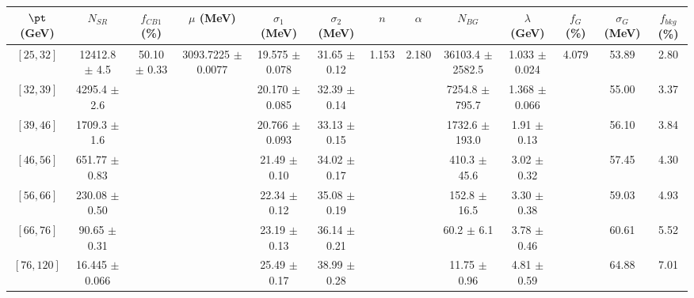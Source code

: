 \begin{tabular}{c||c|c|c|c|c|c|c|c|c|c|c||c}
$\pt$ (GeV) & $N_{SR}$ & $f_{CB1}$ (\%) & $\mu$ (MeV) & $\sigma_1$ (MeV) & $\sigma_2$ (MeV) & $n$ & $\alpha$ & $N_{BG}$ & $\lambda$ (GeV) & $f_G$ (\%) & $\sigma_G$ (MeV) & $f_{bkg}$ (\%) \\
\hline
$[25, 32]$ & 12412.8 $\pm$ 4.5 & \multirow{7}{*}{50.10 $\pm$ 0.33} & \multirow{7}{*}{3093.7225 $\pm$ 0.0077} & 19.575 $\pm$ 0.078 & 31.65 $\pm$ 0.12 & \multirow{7}{*}{1.153} & \multirow{7}{*}{2.180} & 36103.4 $\pm$ 2582.5 & 1.033 $\pm$ 0.024 & \multirow{7}{*}{4.079} & 53.89 & 2.80\\
$[32, 39]$ & 4295.4 $\pm$ 2.6 &  &  & 20.170 $\pm$ 0.085 & 32.39 $\pm$ 0.14 &  &  & 7254.8 $\pm$ 795.7 & 1.368 $\pm$ 0.066 &  & 55.00 & 3.37\\
$[39, 46]$ & 1709.3 $\pm$ 1.6 &  &  & 20.766 $\pm$ 0.093 & 33.13 $\pm$ 0.15 &  &  & 1732.6 $\pm$ 193.0 & 1.91 $\pm$ 0.13 &  & 56.10 & 3.84\\
$[46, 56]$ & 651.77 $\pm$ 0.83 &  &  & 21.49 $\pm$ 0.10 & 34.02 $\pm$ 0.17 &  &  & 410.3 $\pm$ 45.6 & 3.02 $\pm$ 0.32 &  & 57.45 & 4.30\\
$[56, 66]$ & 230.08 $\pm$ 0.50 &  &  & 22.34 $\pm$ 0.12 & 35.08 $\pm$ 0.19 &  &  & 152.8 $\pm$ 16.5 & 3.30 $\pm$ 0.38 &  & 59.03 & 4.93\\
$[66, 76]$ & 90.65 $\pm$ 0.31 &  &  & 23.19 $\pm$ 0.13 & 36.14 $\pm$ 0.21 &  &  & 60.2 $\pm$ 6.1 & 3.78 $\pm$ 0.46 &  & 60.61 & 5.52\\
$[76, 120]$ & 16.445 $\pm$ 0.066 &  &  & 25.49 $\pm$ 0.17 & 38.99 $\pm$ 0.28 &  &  & 11.75 $\pm$ 0.96 & 4.81 $\pm$ 0.59 &  & 64.88 & 7.01\\
\end{tabular}
